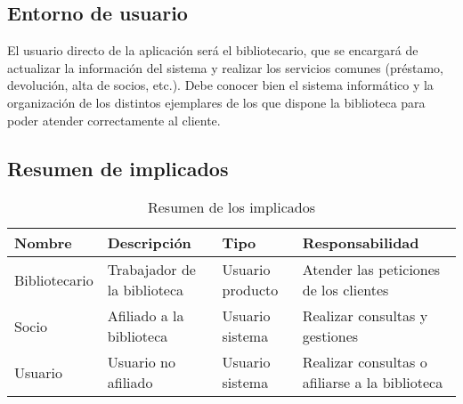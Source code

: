 \documentclass[12pt,spanish]{article}
\begin{document}
\subsection{Entorno de usuario}
 El usuario directo de la aplicación será el bibliotecario, que se encargará de actualizar la información del sistema y realizar los servicios comunes (préstamo, devolución, alta de socios, etc.). Debe conocer bien el sistema informático y la organización de los distintos ejemplares de los que dispone la biblioteca para poder atender correctamente al cliente.
\subsection{Resumen de implicados} 
\begin{table}[hptb]
\begin{center}
\begin{tabular}{|l|p{4cm}|p{2cm}|p{4cm}|}
\hline
\textbf{Nombre} & \textbf{Descripción} & \textbf{Tipo} & \textbf{Responsabilidad} \\
\hline
Bibliotecario & Trabajador de la biblioteca & Usuario producto & Atender las peticiones de los clientes \\
\hline
Socio & Afiliado a la biblioteca & Usuario sistema & Realizar consultas y gestiones \\
\hline
Usuario & Usuario no afiliado & Usuario sistema & Realizar consultas o afiliarse a la biblioteca \\
\hline
\end{tabular}
\caption{Resumen de los implicados}
\end{center}
\end{table}

\end{document}
